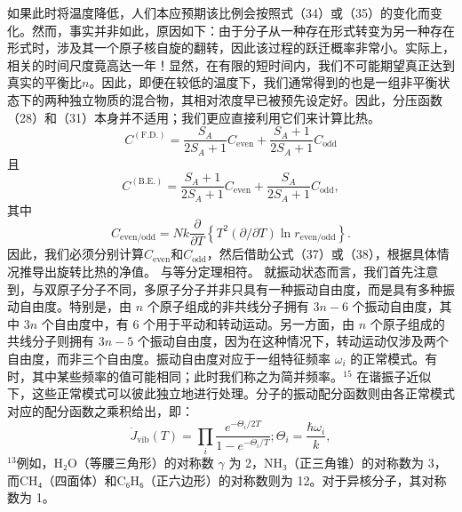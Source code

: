 如果此时将温度降低，人们本应预期该比例会按照式（34）或（35）的变化而变化。然而，事实并非如此，原因如下：由于分子从一种存在形式转变为另一种存在形式时，涉及其一个原子核自旋的翻转，因此该过程的跃迁概率非常小。实际上，相关的时间尺度竟高达一年！显然，在有限的短时间内，我们不可能期望真正达到真实的平衡比\(n\)。因此，即便在较低的温度下，我们通常得到的也是一组非平衡状态下的两种独立物质的混合物，其相对浓度早已被预先设定好。因此，分压函数（28）和（31）本身并不适用；我们更应直接利用它们来计算比热。
\begin{equation}\tag{6.5.42}\label{eq:6.5.42}
C ^{( \mathrm { F . D .} ) } = \frac { S _ { A } } { 2 S _ { A } + 1 } C _ { \mathrm { e v e n } } + \frac { S _ { A } + 1 } { 2 S _ { A } + 1 } C _ { \mathrm { o d d } }
\end{equation}
且
\begin{equation}\tag{6.5.43}\label{eq:6.5.43}
C ^{( \mathrm { B . E .} ) } = \frac { S _ { A } + 1 } { 2 S _ { A } + 1 } C _ { \mathrm { e v e n } } + \frac { S _ { A } } { 2 S _ { A } + 1 } C _ { \mathrm { o d d } } ,
\end{equation}
其中
\begin{equation}\tag{6.5.44}\label{eq:6.5.44}
C _ { \mathrm { e v e n / o d d } } = N k \frac { \partial } { \partial T } \left\{ T ^{2} ( \partial / \partial T ) \ln r _ { \mathrm { e v e n / o d d } } \right\} .
\end{equation}
因此，我们必须分别计算\(C_{\mathrm{even}}\)和\(C_{\mathrm{odd}}\)，然后借助公式（37）或（38），根据具体情况推导出旋转比热的净值。
与等分定理相符。
就振动状态而言，我们首先注意到，与双原子分子不同，多原子分子并非只具有一种振动自由度，而是具有多种振动自由度。特别是，由 \(n\) 个原子组成的非共线分子拥有 \(3n-6\) 个振动自由度，其中 \(3n\) 个自由度中，有 \(6\) 个用于平动和转动运动。另一方面，由 \(n\) 个原子组成的共线分子则拥有 \(3n-5\) 个振动自由度，因为在这种情况下，转动运动仅涉及两个自由度，而非三个自由度。振动自由度对应于一组特征频率 \(\omega_i\) 的正常模式。有时，其中某些频率的值可能相同；此时我们称之为简并频率。\(^{15}\)
在谐振子近似下，这些正常模式可以彼此独立地进行处理。分子的振动配分函数则由各正常模式对应的配分函数之乘积给出，即：
\begin{equation}\tag{6.5.45}\label{eq:6.5.45}
\dot { J } _ { \mathrm { v i b } } ( T ) = \prod _ { i } \frac { e ^{- \Theta _ { i} / 2 T } } { 1 - e ^{- \Theta _ { i} / T } } ;  \Theta _ { i } = \frac { \hbar \omega _ { i } } { k } ,
\end{equation}
\(^{13}\)例如，H₂O（等腰三角形）的对称数 \(\gamma\) 为 2，NH₃（正三角锥）的对称数为 3，而CH₄（四面体）和C₆H₆（正六边形）的对称数则为 12。对于异核分子，其对称数为 1。
